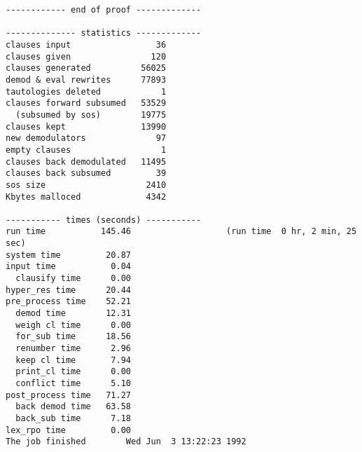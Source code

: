 {\begin{verbatim}
------------ end of proof -------------

-------------- statistics -------------
clauses input                 36
clauses given                120
clauses generated          56025
demod & eval rewrites      77893
tautologies deleted            1
clauses forward subsumed   53529
  (subsumed by sos)        19775
clauses kept               13990
new demodulators              97
empty clauses                  1
clauses back demodulated   11495
clauses back subsumed         39
sos size                    2410
Kbytes malloced             4342

----------- times (seconds) -----------
run time           145.46                   (run time  0 hr, 2 min, 25 sec)
system time         20.87
input time           0.04
  clausify time      0.00
hyper_res time      20.44
pre_process time    52.21
  demod time        12.31
  weigh cl time      0.00
  for_sub time      18.56
  renumber time      2.96
  keep cl time       7.94
  print_cl time      0.00
  conflict time      5.10
post_process time   71.27
  back demod time   63.58
  back_sub time      7.18
lex_rpo time         0.00
The job finished        Wed Jun  3 13:22:23 1992
\end{verbatim} }
